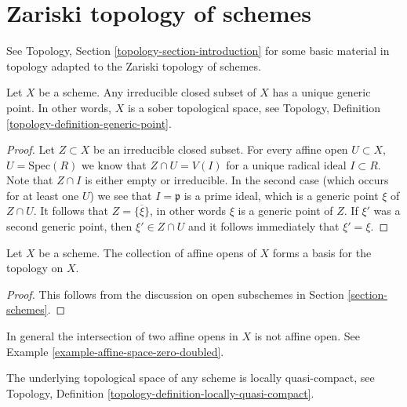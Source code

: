 \section{Zariski topology of schemes}
\label{section-topology}

\noindent
See Topology, Section \ref{topology-section-introduction}
for some basic material in topology adapted to the Zariski
topology of schemes.

\begin{lemma}
\label{lemma-scheme-sober}
Let $X$ be a scheme.
Any irreducible closed subset of $X$ has a unique generic point.
In other words, $X$ is a sober topological space, see
Topology, Definition \ref{topology-definition-generic-point}.
\end{lemma}

\begin{proof}
Let $Z \subset X$ be an irreducible closed subset.
For every affine open $U \subset X$, $U = \text{Spec}(R)$
we know that $Z \cap U = V(I)$ for a unique
radical ideal $I \subset R$. Note that $Z \cap I$ is either
empty or irreducible. In the second case (which occurs
for at least one $U$) we see that $I = \mathfrak p$
is a prime ideal, which is a generic point $\xi$ of $Z \cap U$.
It follows that $Z = \overline{\{\xi\}}$, in other words
$\xi$ is a generic point of $Z$. If $\xi'$ was a second
generic point, then $\xi' \in Z \cap U$ and it follows
immediately that $\xi' = \xi$.
\end{proof}

\begin{lemma}
\label{lemma-basis-affine-opens}
Let $X$ be a scheme. The collection of affine opens
of $X$ forms a basis for the topology on $X$.
\end{lemma}

\begin{proof}
This follows from the discussion on open subschemes
in Section \ref{section-schemes}.
\end{proof}

\begin{remark}
\label{remark-intersection-affine-opens}
In general the intersection of two affine opens in $X$
is not affine open. See Example \ref{example-affine-space-zero-doubled}.
\end{remark}

\begin{lemma}
\label{lemma-locally-quasi-compact}
The underlying topological space of any scheme is
locally quasi-compact, see
Topology, Definition \ref{topology-definition-locally-quasi-compact}.
\end{lemma}

